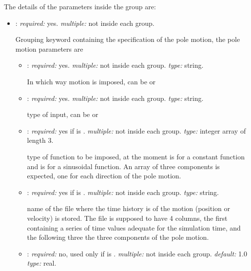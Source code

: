 The details of the parameters inside the  group are:
\begin{itemize}
\item {}: \textit{required:} yes. \textit{multiple:} 
not inside each  group.

Grouping keyword containing the specification of the pole motion, 
the pole motion parameters are

    \begin{itemize}
    \item {}: \textit{required:} yes. \textit{multiple:} 
    not inside each  group. \textit{type:} string.
    
    In which way motion is imposed, can be  or 
    
    \item {}: \textit{required:} yes. \textit{multiple:} 
    not inside each  group. \textit{type:} string.
    
    type of input, can be  or 
    
    \item {}: \textit{required:} yes if  
    is . \textit{multiple:} not inside each  
    group. \textit{type:} integer array of length 3.
    
    type of function to be imposed, at the moment  is for a constant 
    function and  is for a sinusoidal function. An array of three 
    components is expected, one for each direction of the pole motion.    

        \item {}: \textit{required:} yes if  
        is . \textit{multiple:} not inside each  
        group. \textit{type:} string.
        
        name of the file where the time history is of the motion 
        (position or velocity) is stored. The file is supposed to have 
        4 columns, the first containing a series of time values adequate 
        for the simulation time, and the following three the three components 
        of the pole motion. 
        
    \item {}: \textit{required:} no, used only if      
    is . \textit{multiple:} not inside each  group. 
    \textit{default:} 1.0 \textit{type:} real.
    

\end{itemize}
\end{itemize}
